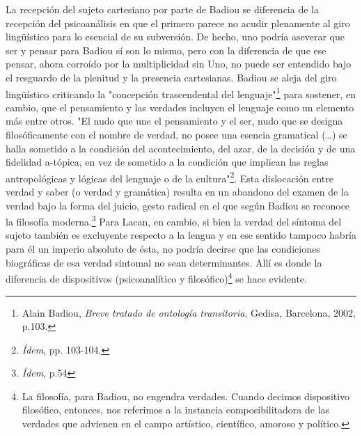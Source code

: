 La recepción del sujeto cartesiano por parte de Badiou se diferencia de
la recepción del psicoanálisis en que el primero parece no acudir
plenamente al giro lingüístico para lo esencial de su subversión. De
hecho, uno podría aseverar que ser y pensar para Badiou sí son lo mismo,
pero con la diferencia de que ese pensar, ahora corroído por la
multiplicidad sin Uno, no puede ser entendido bajo el resguardo de la
plenitud y la presencia cartesianas. Badiou se aleja del giro
lingüístico criticando la "concepción trascendental del
lenguaje"\footnote{Alain Badiou, \emph{Breve tratado de ontología
  transitoria}, Gedisa, Barcelona, 2002, p.103.} para sostener, en
cambio, que el pensamiento y las verdades incluyen el lenguaje como un
elemento más entre otros. "El nudo que une el pensamiento y el ser, nudo
que se designa filosóficamente con el nombre de verdad, no posee una
esencia gramatical (\ldots) se halla sometido a la condición del
acontecimiento, del azar, de la decisión y de una fidelidad a-tópica, en
vez de sometido a la condición que implican las reglas antropológicas y
lógicas del lenguaje o de la cultura"\footnote{\emph{Ídem}, pp. 103-104.}.
Esta dislocación entre verdad y saber (o verdad y gramática) resulta en
un abandono del examen de la verdad bajo la forma del juicio, gesto
radical en el que según Badiou se reconoce la filosofía
moderna.\footnote{\emph{Ídem}, p.54} Para Lacan, en cambio, si bien la
verdad del síntoma del sujeto también es excluyente respecto a la lengua
y en ese sentido tampoco habría para él un imperio absoluto de ésta, no
podría decirse que las condiciones biográficas de esa verdad sintomal no
sean determinantes. Allí es donde la diferencia de dispositivos
(psicoanalítico y filosófico)\footnote{La filosofía, para Badiou, no
  engendra verdades. Cuando decimos dispositivo filosófico, entonces,
  nos referimos a la instancia composibilitadora de las verdades que
  advienen en el campo artístico, científico, amoroso y político.} se
hace evidente.

